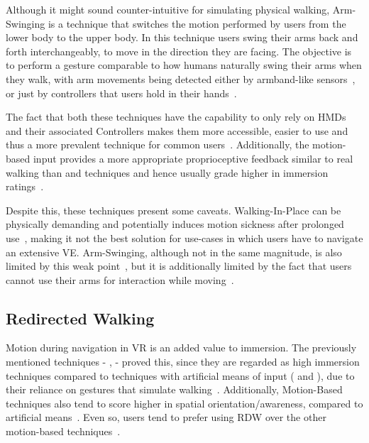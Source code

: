 Although it might sound counter-intuitive for simulating physical walking, Arm-Swinging is a technique that switches the 
motion performed by users from the lower body to the upper body. In this technique users swing their arms back and forth interchangeably, 
to move in the direction they are facing. The objective is to perform a gesture comparable to how humans naturally swing their 
arms when they walk, with arm movements being detected either by armband-like sensors~\cite{Cherni2020}, or just by 
controllers that users hold in their hands~\cite{Coomer2018}.

The fact that both these techniques have the capability to only rely on \glspl{HMD} and their associated 
Controllers makes them more accessible, easier to use and thus a more prevalent technique 
for common users~\cite{Nilsson2018}. Additionally, the motion-based input provides a more appropriate proprioceptive feedback 
similar to real walking than  and  
techniques and hence usually grade higher in immersion ratings~\cite{Boletsis2019}. 

Despite this, these techniques present some caveats. Walking-In-Place can be physically demanding and potentially 
induces motion sickness after prolonged use~\cite{Boletsis2019,Cherni2020}, making it not the best solution for use-cases 
in which users have to navigate an extensive \gls{VE}. Arm-Swinging, although not in the same magnitude, is also limited by this 
weak point~\cite{Coomer2018}, but it is additionally limited by the fact that users cannot use their arms for interaction 
while moving~\cite{Nilsson2018}. 

\subsection{Redirected Walking}
\label{sec:redirected-walking}

Motion during navigation in \gls{VR} is an added value to immersion. The previously mentioned techniques - ,  
 - proved this, since they are regarded as high immersion techniques compared to techniques with artificial means of 
input ( and ), due to their reliance on gestures that simulate walking~\cite{Nasiri2023}.
Additionally, Motion-Based techniques also tend to score higher in spatial orientation/awareness, compared to artificial means~\cite{Cherni2020,Coomer2018}.
Even so, users tend to prefer using \gls{RDW} over the other motion-based techniques~\cite{Langbehn2018, Syamil2024}.

